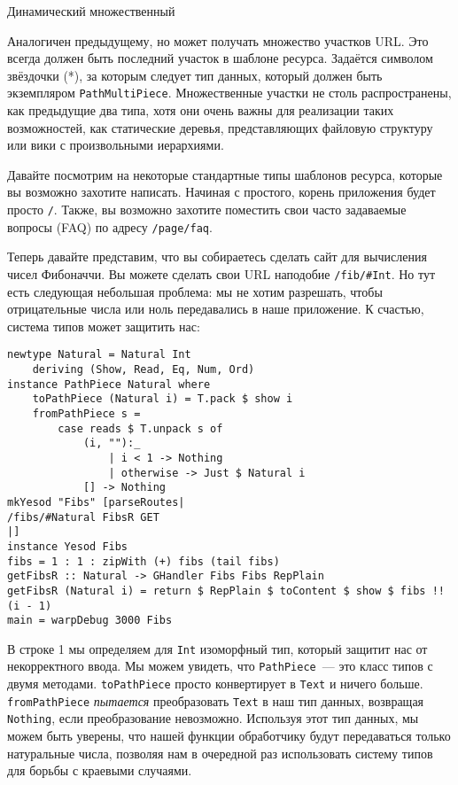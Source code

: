 Динамический множественный

Аналогичен предыдущему, но может получать множество участков URL. Это
всегда должен быть последний участок в шаблоне ресурса. Задаётся
символом звёздочки (*), за которым следует тип данных, который должен
быть экземпляром \lstinline!PathMultiPiece!. Множественные участки не
столь распространены, как предыдущие два типа, хотя они очень важны
для реализации таких возможностей, как статические деревья,
представляющих файловую структуру или вики с произвольными иерархиями.

Давайте посмотрим на некоторые стандартные типы шаблонов ресурса,
которые вы возможно захотите написать. Начиная с простого, корень
приложения будет просто \lstinline!/!. Также, вы возможно захотите
поместить свои часто задаваемые вопросы (FAQ) по адресу
\lstinline!/page/faq!.

Теперь давайте представим, что вы собираетесь сделать сайт для
вычисления чисел Фибоначчи. Вы можете сделать свои URL наподобие
\lstinline!/fib/#Int!. Но тут есть следующая небольшая проблема: мы не
хотим разрешать, чтобы отрицательные числа или ноль передавались в
наше приложение. К счастью, система типов может защитить нас:
\begin{lstlisting}
newtype Natural = Natural Int
    deriving (Show, Read, Eq, Num, Ord)
instance PathPiece Natural where
    toPathPiece (Natural i) = T.pack $ show i
    fromPathPiece s =
        case reads $ T.unpack s of
            (i, ""):_
                | i < 1 -> Nothing
                | otherwise -> Just $ Natural i
            [] -> Nothing
mkYesod "Fibs" [parseRoutes|
/fibs/#Natural FibsR GET
|]
instance Yesod Fibs
fibs = 1 : 1 : zipWith (+) fibs (tail fibs)
getFibsR :: Natural -> GHandler Fibs Fibs RepPlain
getFibsR (Natural i) = return $ RepPlain $ toContent $ show $ fibs !! (i - 1)
main = warpDebug 3000 Fibs
\end{lstlisting}

В строке 1 мы определяем для \lstinline!Int! изоморфный тип, который
защитит нас от некорректного ввода. Мы можем увидеть, что
\lstinline!PathPiece!~--- это класс типов с двумя
методами. \lstinline!toPathPiece! просто конвертирует в
\lstinline!Text! и ничего больше. \lstinline!fromPathPiece!
\emph{пытается} преобразовать \lstinline!Text! в наш тип данных,
возвращая \lstinline!Nothing!, если преобразование
невозможно. Используя этот тип данных, мы можем быть уверены, что
нашей функции обработчику будут передаваться только натуральные числа,
позволяя нам в очередной раз использовать систему типов для борьбы с
краевыми случаями.

